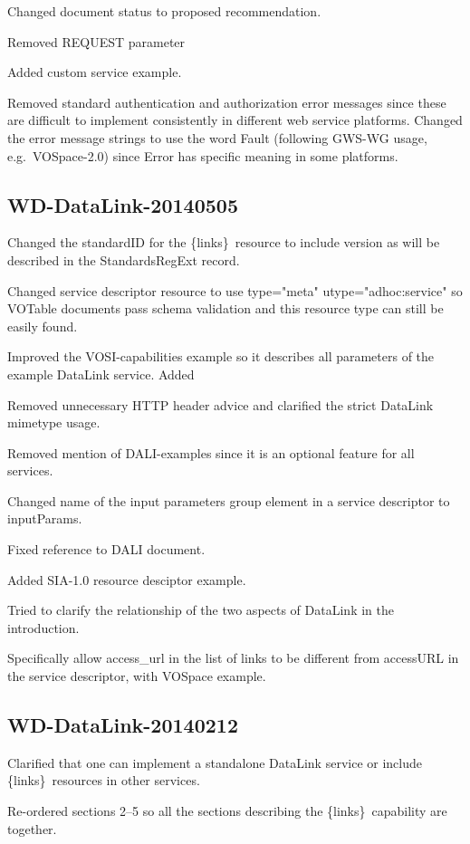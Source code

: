 \documentclass[11pt,a4paper]{ivoa}
\newcommand{\blinks}{\{links\}}
\newcommand{\attval}[2]{#1={\allowbreak}{"}#2{"}}
\begin{document}
Changed document status to proposed recommendation.

Removed REQUEST parameter

Added custom service example.

Removed standard authentication and authorization error messages since
these are difficult to implement consistently in different web service
platforms. Changed the error message strings to use the word Fault
(following GWS-WG usage, e.g.\ VOSpace-2.0) since Error has specific
meaning in some platforms.


\subsection{WD-DataLink-20140505}

Changed the standardID for the \blinks\ resource to include version as
will be described in the StandardsRegExt record.

Changed service descriptor resource to use
\attval{type}{meta} \attval{utype}{adhoc:service}
so VOTable documents pass schema validation and this resource type can
still be easily found.

Improved the VOSI-capabilities example so it describes all parameters
of the example DataLink service.
Added %

Removed unnecessary HTTP header advice and clarified the strict DataLink
mimetype usage.

Removed mention of DALI-examples since it is an optional feature for
all services.

Changed name of the input parameters group element in a service descriptor
to inputParams.

Fixed reference to DALI document.

Added SIA-1.0 resource desciptor example.

Tried to clarify the relationship of the two aspects of DataLink in
the introduction.

Specifically allow access\_url in the list of links to be different from
accessURL in the service descriptor, with VOSpace example.


\subsection{WD-DataLink-20140212}

Clarified that one can implement a standalone DataLink service or include
\blinks\ resources in other services.

Re-ordered sections 2--5 so all the sections describing the
\blinks\ capability are together.
\end{document}
